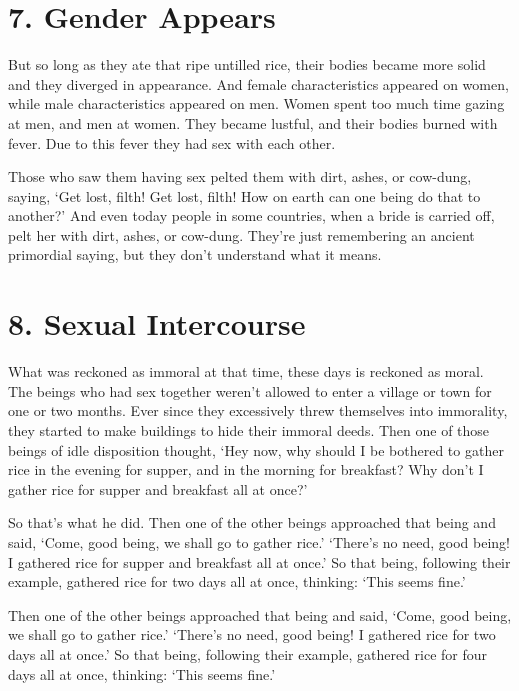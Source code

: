 \documentclass[12pt,openany]{book}%
\begin{document}
\section*{7. Gender Appears }

But so long as they ate that ripe untilled rice, their bodies became more solid and they diverged in appearance. And female characteristics appeared on women, while male characteristics appeared on men. Women spent too much time gazing at men, and men at women. They became lustful, and their bodies burned with fever. Due to this fever they had sex with each other. 

Those who saw them having sex pelted them with dirt, ashes, or cow-dung, saying, ‘Get lost, filth! Get lost, filth! How on earth can one being do that to another?’ And even today people in some countries, when a bride is carried off, pelt her with dirt, ashes, or cow-dung. They’re just remembering an ancient primordial saying, but they don’t understand what it means. 

\section*{8. Sexual Intercourse }

What was reckoned as immoral at that time, these days is reckoned as moral. The beings who had sex together weren’t allowed to enter a village or town for one or two months. Ever since they excessively threw themselves into immorality, they started to make buildings to hide their immoral deeds. Then one of those beings of idle disposition thought, ‘Hey now, why should I be bothered to gather rice in the evening for supper, and in the morning for breakfast? Why don’t I gather rice for supper and breakfast all at once?’ 

So that’s what he did. Then one of the other beings approached that being and said, ‘Come, good being, we shall go to gather rice.’ ‘There’s no need, good being! I gathered rice for supper and breakfast all at once.’ So that being, following their example, gathered rice for two days all at once, thinking: ‘This seems fine.’ 

Then one of the other beings approached that being and said, ‘Come, good being, we shall go to gather rice.’ ‘There’s no need, good being! I gathered rice for two days all at once.’ So that being, following their example, gathered rice for four days all at once, thinking: ‘This seems fine.’ 
\end{document}
